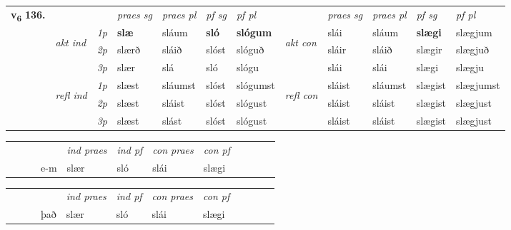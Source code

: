 \begin{tabular}{llllllllllll} \toprule
\multirow{4}{*}{{{\textbf{v{\textsubscript{6}}} \Large{\textbf{136.}}}}}  & &   &  \textit{praes sg}  & \textit{praes pl}  &\textit{ pf sg} & \textit{pf pl} &  &  \textit{praes sg}  & \textit{praes pl}  & \textit{pf sg} & \textit{pf pl } \\*
	\cmidrule{4-7} \cmidrule{9-12}
 & \multirow{3}{*}{\begin{turn}{90}\textit{akt ind}\end{turn}} & {\textit{1p}} & \textbf{slæ} & sláum    & \textbf{sló} & \textbf{slógum} & \multirow{3}{*}{\begin{turn}{90}\textit{akt con}\end{turn}} &slái & sláum & \textbf{slægi} & slægjum\\*
& &  {\textit{2p}} &  slærð  & sláið   & slóst & slóguð & & sláir & sláið & slægir & slægjuð \\*
& &  {\textit{3p}} & slær & slá   & sló & slógu & & slái & slái& slægi & slægju  \\*
\cmidrule{4-7} \cmidrule{9-12}
 &\multirow{3}{*}{\begin{turn}{90}\textit{refl ind}\end{turn}} & {\textit{1p}} & slæst & sláumst    & slóst & slógumst & \multirow{3}{*}{\begin{turn}{90}\textit{refl con}\end{turn}}  &sláist & sláumst & slægist & slægjumst\\*
 &&  {\textit{2p}} &  slæst  & sláist   & slóst & slógust & &sláist & sláist & slægist & slægjust \\*
& &  {\textit{3p}} & slæst & slást   & slóst & slógust & & sláist & sláist& slægist & slægjust  \\*
\cmidrule{4-7} \cmidrule{9-12}
\end{tabular}


\begin{tabular}{llllllllllll}
 & &  & &  \textit{ind praes} & \textit{ind pf} & \textit{con praes} & \textit{con pf} \\*
&  & & e-m & slær & sló & slái & slægi \\*
\cmidrule{5-9}
\end{tabular}


\begin{tabular}{llllllllllll}
 & &  & &  \textit{ind praes} & \textit{ind pf} & \textit{con praes} & \textit{con pf} \\*
&  & & það & slær & sló & slái & slægi \\*
\cmidrule{5-9}
\end{tabular}


